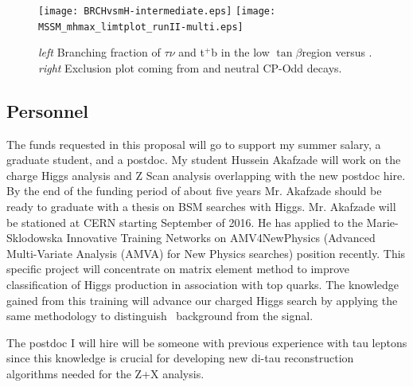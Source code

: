 \documentclass[11pt]{article}
\newcommand{\tanb}{$\tan \beta$}
\newcommand{\too}{$\rightarrow$}
\begin{document}
\begin{figure}\label{fig:plot1}
\begin{center}
\texttt{[image: BRCHvsmH-intermediate.eps]}
\texttt{[image: MSSM\_mhmax\_limtplot\_runII-multi.eps]}
\caption{{ {\it left} Branching fraction of $\tau \nu$ and t$^+ $b in the low \tanb region versus \Hp.  {\it right} Exclusion plot coming from \Hp and neutral CP-Odd decays.}}
\label{fig:brlimits}
\end{center}
\end{figure}

\subsection{Personnel}
\label{sec:per}
The funds requested in this proposal will go to support my summer salary, a graduate student, and a postdoc.  
My student Hussein Akafzade will work on the charge Higgs analysis and Z Scan analysis overlapping with the new postdoc hire. By the end of the funding period of about five years Mr. Akafzade  should be ready to graduate with a thesis on BSM searches with Higgs.
Mr. Akafzade will be stationed at CERN starting September of 2016.  He has applied to the Marie-Sklodowska Innovative Training Networks on AMV4NewPhysics (Advanced Multi-Variate Analysis (AMVA) for New Physics searches) position recently.
This specific project will concentrate on matrix element method to improve classification of Higgs production in association with top quarks. The knowledge gained from this training will
advance our charged Higgs search by applying the same methodology to distinguish \ttbar\ background from the signal.

The postdoc I will hire will be someone with previous experience with tau leptons since this knowledge is crucial for developing new di-tau reconstruction algorithms needed for the Z+X analysis.

\end{document}
